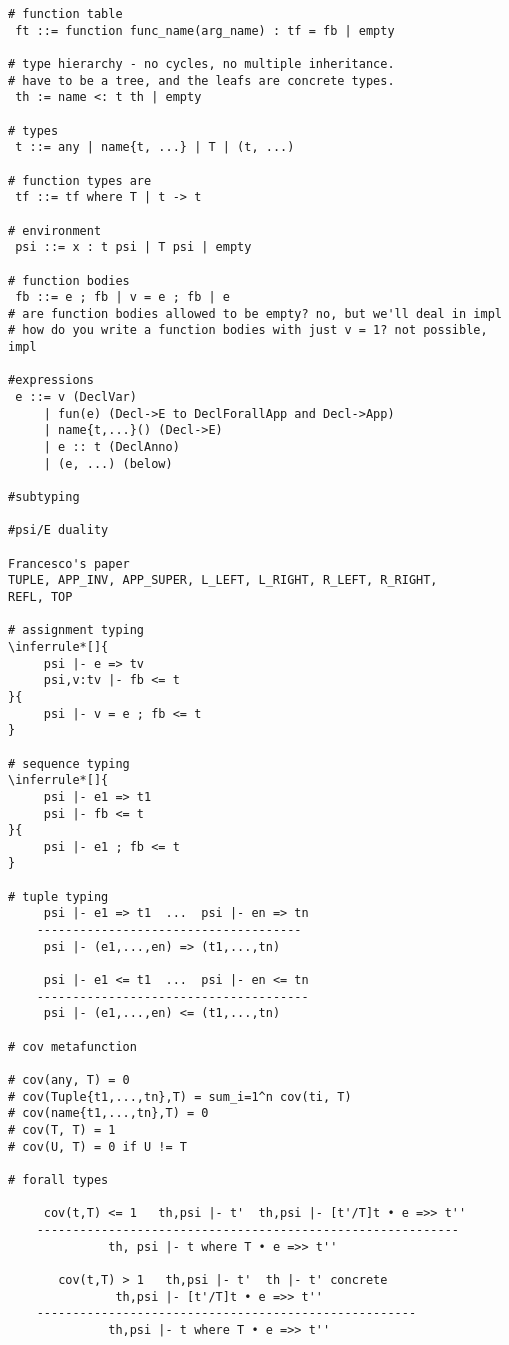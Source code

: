 \documentclass{report} %
\begin{document}
\begin{verbatim}
# function table
 ft ::= function func_name(arg_name) : tf = fb | empty

# type hierarchy - no cycles, no multiple inheritance. 
# have to be a tree, and the leafs are concrete types.
 th := name <: t th | empty

# types
 t ::= any | name{t, ...} | T | (t, ...)

# function types are
 tf ::= tf where T | t -> t

# environment
 psi ::= x : t psi | T psi | empty

# function bodies
 fb ::= e ; fb | v = e ; fb | e 
# are function bodies allowed to be empty? no, but we'll deal in impl
# how do you write a function bodies with just v = 1? not possible, impl

#expressions
 e ::= v (DeclVar)
     | fun(e) (Decl->E to DeclForallApp and Decl->App)
     | name{t,...}() (Decl->E)
     | e :: t (DeclAnno)
     | (e, ...) (below)

#subtyping

#psi/E duality

Francesco's paper
TUPLE, APP_INV, APP_SUPER, L_LEFT, L_RIGHT, R_LEFT, R_RIGHT, 
REFL, TOP

# assignment typing
\inferrule*[]{
     psi |- e => tv
     psi,v:tv |- fb <= t
}{
     psi |- v = e ; fb <= t
}

# sequence typing
\inferrule*[]{
     psi |- e1 => t1
     psi |- fb <= t
}{
     psi |- e1 ; fb <= t
}

# tuple typing
     psi |- e1 => t1  ...  psi |- en => tn
    -------------------------------------
     psi |- (e1,...,en) => (t1,...,tn)

     psi |- e1 <= t1  ...  psi |- en <= tn
    --------------------------------------
     psi |- (e1,...,en) <= (t1,...,tn)

# cov metafunction

# cov(any, T) = 0
# cov(Tuple{t1,...,tn},T) = sum_i=1^n cov(ti, T)
# cov(name{t1,...,tn},T) = 0
# cov(T, T) = 1
# cov(U, T) = 0 if U != T

# forall types

     cov(t,T) <= 1   th,psi |- t'  th,psi |- [t'/T]t • e =>> t''
    -----------------------------------------------------------
              th, psi |- t where T • e =>> t''

       cov(t,T) > 1   th,psi |- t'  th |- t' concrete  
               th,psi |- [t'/T]t • e =>> t''
    -----------------------------------------------------
              th,psi |- t where T • e =>> t''


\end{verbatim}
\end{document}
